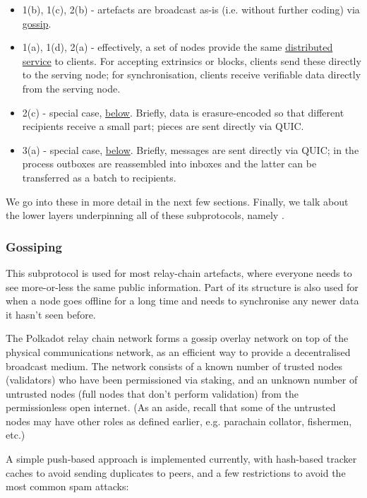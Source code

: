 \begin{itemize}
\item 1(b), 1(c), 2(b) - artefacts are broadcast as-is (i.e. without further coding) via \hyperref[sec:gossiping]{gossip}.
\item 1(a), 1(d), 2(a) - effectively, a set of nodes provide the same \hyperref[sec:net_service]{distributed service} to clients. For accepting extrinsics or blocks, clients send these directly to the serving node; for synchronisation, clients receive verifiable data directly from the serving node.
\item 2(c) - special case, \hyperref[sec:net_storage]{below}. Briefly, data is erasure-encoded so that different recipients receive a small part; pieces are sent directly via QUIC.
\item 3(a) - special case, \hyperref[sec:net_crosschain]{below}. Briefly, messages are sent directly via QUIC; in the process outboxes are reassembled into inboxes and the latter can be transferred as a batch to recipients.
\end{itemize}

We go into these in more detail in the next few sections. Finally, we talk about the lower layers underpinning all of these subprotocols, namely .

\subsubsection{Gossiping} \label{sec:gossiping}

This subprotocol is used for most relay-chain artefacts, where everyone needs to see more-or-less the same public information. Part of its structure is also used for when a node goes offline for a long time and needs to synchronise any newer data it hasn't seen before.

The Polkadot relay chain network forms a gossip overlay network on top of the physical communications network, as an efficient way to provide a decentralised broadcast medium. The network consists of a known number of trusted nodes (validators) who have been permissioned via staking, and an unknown number of untrusted nodes (full nodes that don't perform validation) from the permissionless open internet. (As an aside, recall that some of the untrusted nodes may have other roles as defined earlier, e.g. parachain collator, fishermen, etc.)

A simple push-based approach is implemented currently, with hash-based tracker caches to avoid sending duplicates to peers, and a few restrictions to avoid the most common spam attacks:

